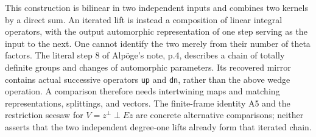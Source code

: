 This construction is bilinear in two independent inputs and combines
two kernels by a direct sum. An iterated lift is instead a composition
of linear integral operators, with the output automorphic
representation of one step serving as the input to the next. One
cannot identify the two merely from their number of theta factors.
The literal step 8 of Alp\"oge's note, p.4, describes a chain of
totally definite groups and changes of automorphic parameters. Its
recovered mirror contains actual successive operators \texttt{up}
and \texttt{dn}, rather than the above wedge operation. A comparison
therefore needs intertwining maps and matching representations,
splittings, and vectors. The finite-frame identity A5 and the
restriction seesaw for $V=z^\perp\perp Ez$ are concrete alternative
comparisons; neither asserts that the two independent degree-one
lifts already form that iterated chain.
